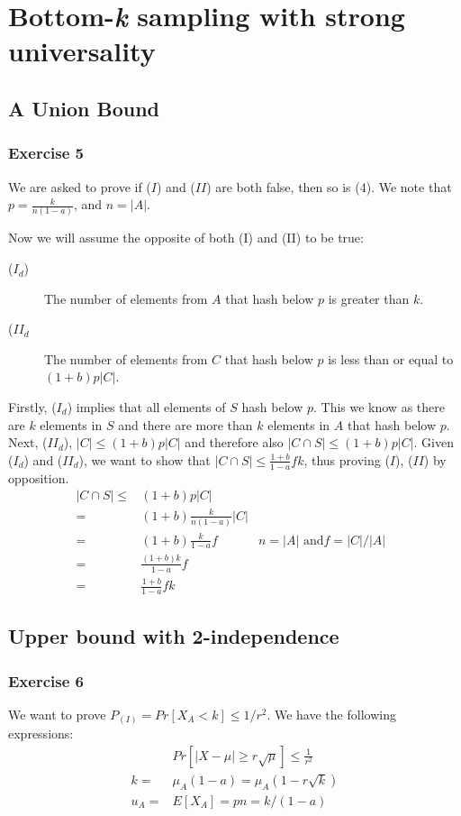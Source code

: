 \section{Bottom-\textit{k} sampling with strong universality}
\subsection{A Union Bound}
\subsubsection{Exercise 5}

We are asked to prove if ($I$) and ($II$) are both false, then so is (4). We note that $p=\frac{k}{n(1-a)}$, and  $n=|A|$.

Now we will assume the opposite of both (I) and (II) to be true:
%
\begin{description}
	\item[($I_{d}$)] The number of elements from $A$ that hash below $p$
	is greater than $k$.
	\item[($II_{d}$] The number of elements from $C$ that hash below $p$
	is less than or equal to $(1+b) p |C|$.
\end{description}
%
Firstly, ($I_{d}$) implies that all elements of $S$ hash below $p$. This we know as there are $k$
elements in $S$ and there are more than $k$ elements in $A$ that hash below
$p$.
Next, ($II_{d}$), $|C|\leq (1+b)p|C|$ and therefore also 
$|C \cap S| \leq (1+b)p|C|$. 
Given ($I_{d}$) and ($II_{d}$), we want to show that  $|C \cap S| \leq \frac{1+b}{1-a} fk$, thus proving ($I$), ($II$) by opposition.
%
\begin{align*}
	|C \cap S| 	\leq & (1+b)p|C| & \\
				=& (1+b) \frac{k}{n(1-a)} |C| & \\
				=& (1+b) \frac{k}{1-a} f  & \text{$n=|A|$ and$f=|C|/|A|$ }\\
				=& \frac{(1+b)k}{1-a} f & \\
				=& \frac{1+b}{1-a} fk & 
\end{align*}

\subsection{Upper bound with 2-independence}
\subsubsection{Exercise 6}
We want to prove $P_{(I)} = Pr \left[ X_A < k\right] \leq 1/r^2$.
We have the following expressions:
%
\begin{align}
	& Pr\left[ |X - \mu| \geq r \sqrt{\mu} \right] \leq \frac{1}{r^2} \label{eq:6:pr}\\
	k =& \mu_A(1-a) = \mu_A(1 - r \sqrt{k}) \label{eq:6:k} \\
	u_A =& E[X_A] = pn = k/(1-a) \label{eq:6:ua} 
	\end{align}
%


